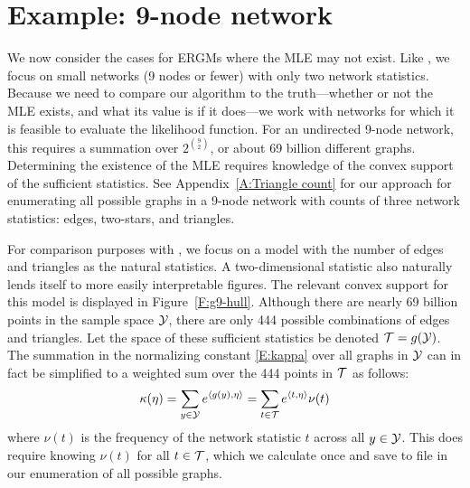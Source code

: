  
\section{Example: 9-node network} \label{S:Example:9node}
We now consider the cases for ERGMs where the MLE may not exist.
Like \citet{Handcock:degeneracy, Rinaldo:2009}, we focus on small networks (9 nodes or 
fewer) with only two network statistics.  
Because we need to compare our algorithm to the truth---whether or not the MLE exists, 
and what its value
is if it does---we work with networks for which it is feasible to 
evaluate the likelihood
function.  For an undirected 9-node network, this requires a summation 
over  $2^{{9\choose 2}}$, or about 69 billion different graphs.  Determining the existence of the MLE
requires knowledge of the convex support of the sufficient statistics.  See 
Appendix~\ref{A:Triangle count} for our approach for enumerating all possible 
graphs in a 9-node network with counts of three network statistics: edges, two-stars, and triangles.


For comparison purposes with \citet{Rinaldo:2009}, we focus on a model with the number 
of edges and triangles as the natural statistics.  A two-dimensional statistic 
also naturally lends itself to more easily interpretable figures.  The relevant convex support for this model is displayed in Figure~\ref{F:g9-hull}.  Although there are nearly 69 billion points in the sample space ${\mathcal Y}$, there are only 444 possible combinations of edges and triangles.
Let the space of these sufficient statistics be denoted ${\mathcal T} = g({\mathcal Y})$.
The summation in the normalizing constant \eqref{E:kappa} over all graphs in ${\mathcal Y}$ can in fact be simplified
 to a weighted sum over the 444 points in ${\mathcal T}$ as follows:
\begin{align*}
	\kappa(\eta) = \sum_{y \in {\mathcal Y}} e^{\langle g(y),\eta \rangle } = 	\sum_{t \in {\mathcal T}} e^{\langle t,\eta \rangle } \nu(t)
\end{align*}
where $\nu(t)$ is the frequency of the network statistic $t$ across all $y \in {\mathcal Y}$.  
This does require knowing $\nu(t)$ for all $t \in {\mathcal T}$, which we calculate once
and save to file in our enumeration of all possible graphs.

